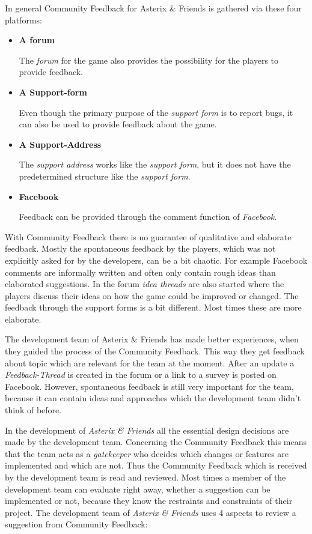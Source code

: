 In general Community Feedback for Asterix \& Friends is gathered via these four platforms:\citep{seibert_interview_2016}

\begin{itemize}
    \item \textbf{A forum}
    
    The \textit{forum} for the game also provides the possibility for the players to provide feedback.
    
     \item \textbf{A Support-form}
     
     Even though the primary purpose of the \textit{support form} is to report bugs, it can also be used to provide feedback about the game.
     
     \item \textbf{A Support-Address}
     
     The \textit{support address} works like the \textit{support form}, but it does not have the predetermined structure like the \textit{support form}.
     
     \item \textbf{Facebook}
     
     Feedback can be provided through the comment function of \textit{Facebook}.
\end{itemize}

With Community Feedback there is no guarantee of qualitative and elaborate feedback. Mostly the spontaneous feedback by the players, which was not explicitly asked for by the developers, can be a bit chaotic. For example Facebook comments are informally written and often only contain rough ideas than elaborated suggestions. In the forum \textit{idea threads} are also started where the players discuss their ideas on how the game could be improved or changed. The feedback through the support forms is a bit different. Most times these are more elaborate.\citep{seibert_interview_2016}

The development team of Asterix \& Friends has made better experiences, when they guided the process of the Community Feedback. This way they get feedback about topic which are relevant for the team at the moment. After an update a \textit{Feedback-Thread} is created in the forum or a link to a survey is posted on Facebook. However, spontaneous feedback is still very important for the team, because it can contain ideas and approaches which the development team didn't think of before.\citep{seibert_interview_2016}

In the development of \textit{Asterix \& Friends} all the essential design decisions are made by the development team. Concerning the Community Feedback this means that the team acts as a \textit{gatekeeper} who decides which changes or features are implemented and which are not. Thus the Community Feedback which is received by the development team is read and reviewed. Most times a member of the development team can evaluate right away, whether a suggestion can be implemented or not, because they know the restraints and constraints of their project. The development team of \textit{Asterix \& Friends} uses 4 aspects to review a suggestion from Community Feedback:\citep{seibert_interview_2016}

